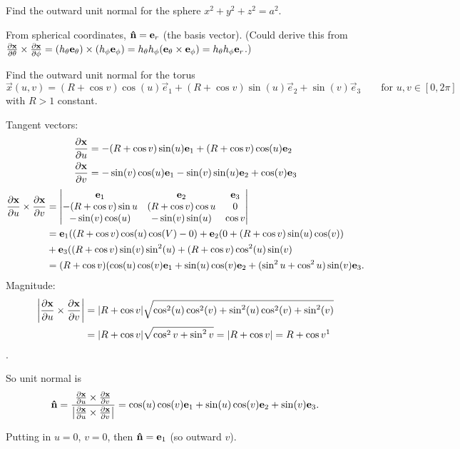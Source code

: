 \documentclass[10pt, a4paper]{article}
\begin{document}
\begin{example}
    Find the outward unit normal for the sphere $x ^ 2 + y ^ 2 + z ^ 2 = a ^ 2$.

    From spherical coordinates,
    $\hvec{n} = \vec{e}_r$
    (the basis vector).
    (Could derive this from $\pd[\vec{x}]{\theta} \times \pd[\vec{x}]{\phi} = (h_{\theta}\vec{e}_{\theta}) \times (h_{\phi}\vec{e}_{\phi}) = h_{\theta}h_{\phi}(\vec{e}_{\theta} \times \vec{e}_{\phi}) = h_{\theta}h_{\phi}\vec{e}_r$.)
\end{example}

\begin{example}
    Find the outward unit normal for the torus
    \[
    \vec{x}(u, v) = (R + \cos{v})\cos(u)\vec{e}_1 + (R + \cos{v})\sin(u)\vec{e}_2 + \sin(v)\vec{e}_3\qquad\text{for } u, v \in [0, 2\pi]
    \]
    with $R > 1$ constant.


    Tangent vectors:
    \begin{align*}
        \pd[\vec{x}]{u} &= -(R + \cos{v})\sin(u)\vec{e}_1 + (R +\cos{v})\cos(u)\vec{e}_2 \\
        \pd[\vec{x}]{v} &= -\sin(v)\cos(u)\vec{e}_1 - \sin(v)\sin(u)\vec{e}_2 + \cos(v)\vec{e}_3
    \end{align*}
    \begin{align*}
        \pd[\vec{x}]{u} \times \pd[\vec{x}]{v} &= \begin{vmatrix}
            \vec{e}_1 & \vec{e}_2 & \vec{e}_3 \\
            -(R + \cos{v})\sin{u} & (R + \cos{v})\cos{u} & 0 \\
            -\sin(v)\cos(u) & -\sin(v)\sin(u) & \cos{v}
        \end{vmatrix} \\
        &=\vec{e}_1((R + \cos{v})\cos(u)\cos(V) - 0) + \vec{e}_2(0 + (R + \cos{v})\sin(u)\cos(v)) \\
        &+ \vec{e}_3((R + \cos{v})\sin(v)\sin ^ 2(u) + (R + \cos{v})\cos ^ 2(u)\sin(v) \\
        &= (R + \cos{v})(\cos(u)\cos(v)\vec{e}_1 + \sin(u)\cos(v)\vec{e}_2 + (\sin ^ 2u + \cos ^ 2u)\sin(v)\vec{e}_3.
    \end{align*}
    Magnitude:
    \begin{align*}
        \left|\pd[\vec{x}]{u} \times \pd[\vec{x}]{v}\right| &= |R + \cos{v}|\sqrt{\cos ^ 2(u)\cos ^ 2(v) + \sin ^ 2(u)\cos ^ 2(v) + \sin ^ 2(v)} \\
        &= |R + \cos{v}|\sqrt{\cos ^ 2{v} + \sin ^ 2{v}} = |R + \cos{v}| = R + \cos{v}\footnotemark
    \end{align*}
    .

    So unit normal is
    \[
    \hvec{n} = \frac{\pd[\vec{x}]{u} \times \pd[\vec{x}]{v}}{\left|\pd[\vec{x}]{u} \times \pd[\vec{x}]{v}\right|} = \cos(u)\cos(v)\vec{e}_1 + \sin(u)\cos(v)\vec{e}_2 + \sin(v)\vec{e}_3.
    \]

    Putting in $u = 0$,
    $v = 0$,
    then
    $\hvec{n} = \vec{e}_1$
    (so outward $v$).
\end{example}
\end{document}
